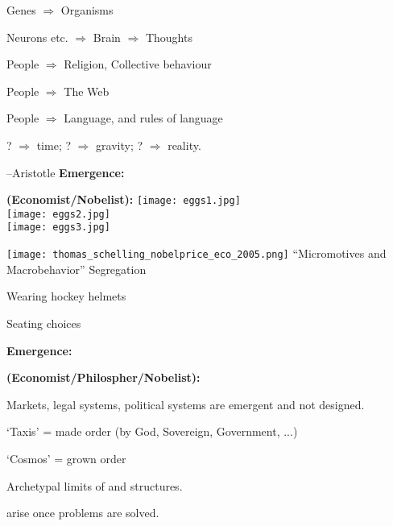       Genes $\Rightarrow$ Organisms
    
      Neurons etc. $\Rightarrow$ Brain $\Rightarrow$ Thoughts
     
      People $\Rightarrow$ Religion, Collective behaviour
    
      People $\Rightarrow$ The Web
    
      People $\Rightarrow$ Language, and rules of language
    
      ? $\Rightarrow$ time; 
      ? $\Rightarrow$ gravity;
      ? $\Rightarrow$ reality.
  
    --Aristotle
  \textbf{Emergence:}

  \textbf{
      \smallskip
      (Economist/Nobelist):}
    \medskip
      \texttt{[image: eggs1.jpg]}\\
      \texttt{[image: eggs2.jpg]}\\
      \texttt{[image: eggs3.jpg]}\\
      
      \begin{center}
      \texttt{[image: thomas\_schelling\_nobelprice\_eco\_2005.png]}
        ``Micromotives and Macrobehavior''\cite{schelling1978a}
          Segregation\cite{schelling1971a,schelling2006a}
        
          Wearing hockey helmets\cite{schelling1973a}
        
          Seating choices
      \end{center}
  \textbf{Emergence:}

  \textbf{
      \smallskip
      (Economist/Philospher/Nobelist):
    }
    
     Markets, legal systems, political systems are emergent and not designed.
       
      `Taxis' = made order (by God, Sovereign, Government, ...)
    
      `Cosmos' = grown order
    
      Archetypal limits of  and  structures.
    
       arise once problems are solved.\cite{dodds2003c}
    
